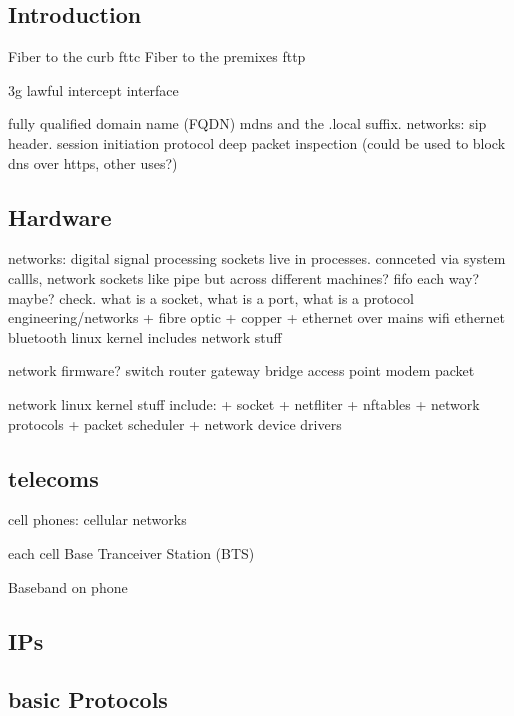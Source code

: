 
\subsection{Introduction}

Fiber to the curb fttc
Fiber to the premixes fttp

3g lawful intercept interface

fully qualified domain name (FQDN)
mdns and the .local suffix.
networks: sip header. session initiation protocol
deep packet inspection (could be used to block dns over https, other uses?)

\subsection{Hardware}

networks: digital signal processing
sockets live in processes. connceted via system callls, network
sockets like pipe but across different machines? fifo each way? maybe? check.
what is a socket, what is a port, what is a protocol
engineering/networks
+ fibre optic
+ copper
+ ethernet over mains
wifi
ethernet
bluetooth
linux kernel includes network stuff

network firmware?
switch
router
gateway
bridge
access point
modem
packet

network linux kernel stuff include:
+ socket
+ netfliter
+ nftables
+ network protocols
+ packet scheduler
+ network device drivers

\subsection{telecoms}

cell phones: cellular networks

each cell Base Tranceiver Station (BTS)

Baseband on phone

\subsection{IPs}

\subsection{basic Protocols}


